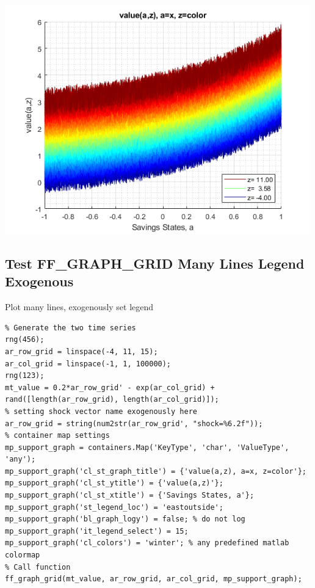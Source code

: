 \documentclass[
]{book}
\begin{document}
\includegraphics[width=5.20833in,height=\textheight]{img/fx_graph_grid_images/figure_6.png}

\hypertarget{test-ff_graph_grid-many-lines-legend-exogenous}{%
\subsection{Test FF\_GRAPH\_GRID Many Lines Legend Exogenous}\label{test-ff_graph_grid-many-lines-legend-exogenous}}

Plot many lines, exogenously set legend

\begin{verbatim}
% Generate the two time series
rng(456);
ar_row_grid = linspace(-4, 11, 15);
ar_col_grid = linspace(-1, 1, 100000);
rng(123);
mt_value = 0.2*ar_row_grid' - exp(ar_col_grid) + rand([length(ar_row_grid), length(ar_col_grid)]);
% setting shock vector name exogenously here
ar_row_grid = string(num2str(ar_row_grid', "shock=%6.2f"));
% container map settings
mp_support_graph = containers.Map('KeyType', 'char', 'ValueType', 'any');
mp_support_graph('cl_st_graph_title') = {'value(a,z), a=x, z=color'};
mp_support_graph('cl_st_ytitle') = {'value(a,z)'};
mp_support_graph('cl_st_xtitle') = {'Savings States, a'};
mp_support_graph('st_legend_loc') = 'eastoutside';
mp_support_graph('bl_graph_logy') = false; % do not log
mp_support_graph('it_legend_select') = 15;
mp_support_graph('cl_colors') = 'winter'; % any predefined matlab colormap
% Call function
ff_graph_grid(mt_value, ar_row_grid, ar_col_grid, mp_support_graph);
\end{verbatim}
\end{document}
